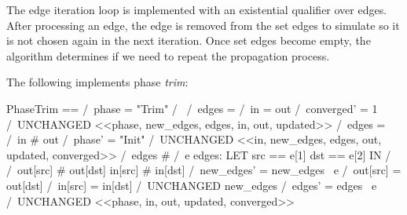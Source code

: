 The edge iteration loop is implemented with an existential qualifier over edges.
After processing an edge, the edge is removed from the set edges to simulate so
it is not chosen again in the next iteration. Once set edges become empty, the
algorithm determines if we need to repeat the propagation process.\\

\pagebreak

The following implements phase \textit{trim}:\\
\begin{tla}
PhaseTrim == 
    /\ phase = "Trim"
    /\ \/ /\ edges = {}
          /\ in = out
          /\ converged' = 1
          /\ UNCHANGED <<phase, new_edges, edges, in, out, updated>>
       \/ /\ edges = {}
          /\ in # out
          /\ phase' = "Init"
          /\ UNCHANGED <<in, new_edges, edges, out, updated, converged>>
       \/ /\ edges # {}
          /\ \E e \in edges:
            LET 
                src == e[1]
                dst == e[2]
            IN
                /\ \/ /\ out[src] # out[dst] \/ in[src] # in[dst]
                      /\ new_edges' = new_edges \ {e}
                   \/ /\ out[src] = out[dst] /\ in[src] = in[dst]
                      /\ UNCHANGED new_edges
                /\ edges' = edges \ {e}
          /\ UNCHANGED <<phase, in, out, updated, converged>>
\end{tla}
\begin{tlatex}
%
%
%
%
%
%
%
%
%
%
%
%
%
%
%
%
\end{tlatex}
\\

